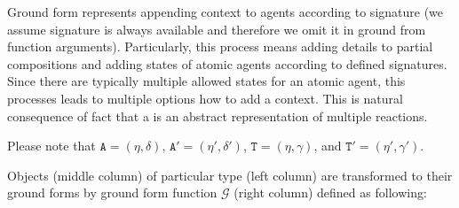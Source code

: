\documentclass[12pt]{fithesis2}
\begin{document}
Ground form represents appending context to agents according to signature (we assume signature is always available and therefore we omit it in ground from function arguments). Particularly, this process means adding details to partial compositions and adding states of atomic agents according to defined signatures. Since there are typically multiple allowed states for an atomic agent, this processes leads to multiple options how to add a context. This is natural consequence of fact that a is an abstract representation of multiple reactions. 

Please note that $\mathtt{A} = (\eta, \delta)$, $\mathtt{A}' = (\eta', \delta')$, $\mathtt{T} = (\eta, \gamma)$, and $\mathtt{T}' = (\eta', \gamma')$.

Objects (middle column) of particular type (left column) are transformed to their ground forms by ground form function $\mathcal{G}$ (right column) defined as following:
\end{document}
